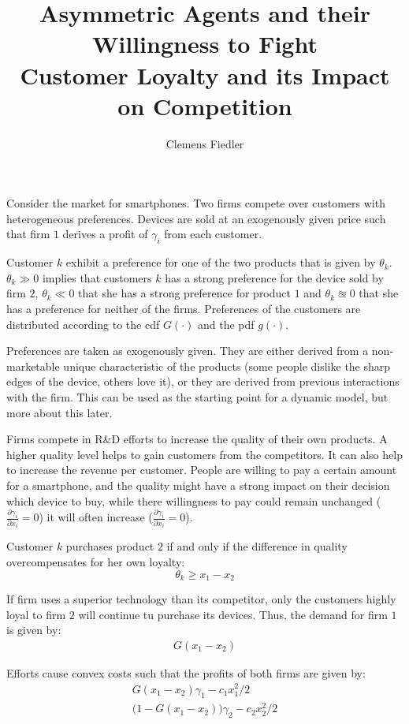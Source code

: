 \documentclass[a4paper, 11pt]{article}
\author{Clemens Fiedler}
\title{Asymmetric Agents and their Willingness to Fight\\
	Customer Loyalty and its Impact on Competition}
\begin{document}
	
\maketitle

Consider the market for smartphones. Two firms compete over customers with heterogeneous preferences. Devices are sold at an exogenously given price such that firm $1$ derives a profit of $\gamma_i$ from each customer.

Customer $k$ exhibit a preference for one of the two products that is given by $\theta_k$. $\theta_k\gg0$ implies that customers $k$ has a strong preference for the device sold by firm $2$, $\theta_k\ll0$ that she has a strong preference for product $1$ and $\theta_k\approxeq 0$ that she has a preference for neither of the firms. Preferences of the customers are distributed according to the cdf $G(\cdot)$ and the pdf $g(\cdot)$.

Preferences are taken as exogenously given. They are either derived from a non-marketable unique characteristic of the products (some people dislike the sharp edges of the device, others love it), or they are derived from previous interactions with the firm. This can be used as the starting point for a dynamic model, but more about this later.

Firms compete in R\&D efforts to increase the quality of their own products. A higher quality level helps to gain customers from the competitors. It can also help to increase the revenue per customer. People are willing to pay a certain amount for a smartphone, and the quality might have a strong impact on their decision which device to buy, while there willingness to pay could remain unchanged ($\frac{\partial \gamma_i}{\partial x_i}=0$) it will often increase ($\frac{\partial \gamma_i}{\partial x_i}=0$).

Customer $k$ purchases product $2$ if and only if the difference in quality overcompensates for her own loyalty:
$$\theta_k\geq x_1-x_2$$

If firm uses a superior technology than its competitor, only the customers highly loyal to firm $2$ will continue tu purchase its devices. Thus, the demand for firm $1$ is given by:
\begin{align*}
G(x_1-x_2)
\end{align*}

Efforts cause convex costs such that the profits of both firms are given by:
\begin{align}
G(x_1-x_2)\gamma_1 - c_1x_1^2/2\\
\big(1-G(x_1-x_2)\big)\gamma_2 - c_2x_2^2/2
\end{align}
\end{document}
